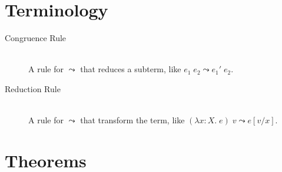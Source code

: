 \documentclass[a4paper,11pt]{article}
\begin{document}
\section{Terminology}
{
    \begin{description}
    \item[Congruence Rule]\hfill\\A rule for \(\leadsto\) that reduces a subterm, like \(e_1\;e_2 \leadsto e_1'\;e_2\).
    \item[Reduction Rule]\hfill\\A rule for \(\leadsto\) that transform the term, like \((\lambda x:X.\;e)\;v \leadsto
    e[v/x]\).
    \end{description}
}
\section{Theorems}
\end{document}
